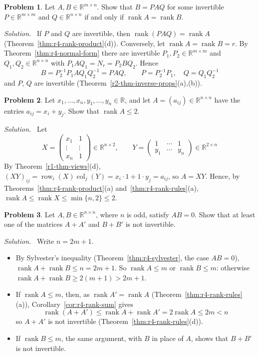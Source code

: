 \documentclass[12pt]{article}
\newcommand{\R}{\mathbb R}
\DeclareMathOperator{\row}{row}
\DeclareMathOperator{\col}{col}
\DeclareMathOperator{\rank}{rank}
\theoremstyle{definition}
\newtheorem{problem}{Problem}
\newenvironment{solution}{\par\noindent\textit{Solution.}\ }{\par\smallskip}
\begin{document}
\begin{problem}\label{r4-ex-equivalent}
Let \(A,B\in\R^{m\times n}\). Show that \(B=PAQ\) for some invertible \(P\in\R^{m\times m}\) and \(Q\in\R^{n\times n}\)
if and only if \(\rank A=\rank B\).
\end{problem}
\begin{solution}
If \(P\) and \(Q\) are invertible, then \(\rank(PAQ)=\rank A\) (Theorem~\ref{thm:r4-rank-product}(d)). Conversely, let
\(\rank A=\rank B=r\). By Theorem~\ref{thm:r4-normal-form} there are invertible \(P_1,P_2\in\R^{m\times m}\) and \(Q_1,Q_2\in\R^{n\times n}\) with
\(P_1AQ_1=N_r=P_2BQ_2\). Hence
\[
B=P_2^{-1}P_1AQ_1Q_2^{-1}=PAQ,\qquad P=P_2^{-1}P_1,\quad Q=Q_1Q_2^{-1}
\]
and \(P\), \(Q\) are invertible (Theorem~\ref{r2-thm-inverse-props}(a),(b)).
\end{solution}

\begin{problem}\label{r4-ex-pr-rank-two}
Let \(x_1,\dots,x_n,y_1,\dots,y_n\in\R\), and let \(A=(a_{ij})\in\R^{n\times n}\) have the entries \(a_{ij}=x_i+y_j\).
Show that \(\rank A\leqslant2\).
\end{problem}
\begin{solution}
Let
\[
X=\begin{pmatrix}x_1&1\\\vdots&\vdots\\x_n&1\end{pmatrix}\in\R^{n\times2},\qquad
Y=\begin{pmatrix}1&\cdots&1\\y_1&\cdots&y_n\end{pmatrix}\in\R^{2\times n}
\]
By Theorem~\ref{r1-thm-views}(d), \((XY)_{ij}=\row_i(X)\col_j(Y)=x_i\cdot1+1\cdot y_j=a_{ij}\), so \(A=XY\). Hence, by
Theorems~\ref{thm:r4-rank-product}(a) and~\ref{thm:r4-rank-rules}(a),
\(\rank A\leqslant\rank X\leqslant\min\{n,2\}\leqslant2\).
\end{solution}

\begin{problem}\label{r4-ex-pr-odd-order}
Let \(A,B\in\R^{n\times n}\), where \(n\) is odd, satisfy \(AB=0\). Show that at least one of the matrices \(A+A'\) and
\(B+B'\) is not invertible.
\end{problem}
\begin{solution}
Write \(n=2m+1\).
\begin{itemize}
\item By Sylvester's inequality (Theorem~\ref{thm:r4-sylvester}, the case \(AB=0\)),
\(\rank A+\rank B\leqslant n=2m+1\). So \(\rank A\leqslant m\) or \(\rank B\leqslant m\): otherwise
\(\rank A+\rank B\geqslant2(m+1)>2m+1\).
\item If \(\rank A\leqslant m\), then, as \(\rank A'=\rank A\) (Theorem~\ref{thm:r4-rank-rules}(a)),
Corollary~\ref{cor:r4-rank-sum} gives
\[
\rank(A+A')\leqslant\rank A+\rank A'=2\rank A\leqslant2m<n
\]
so \(A+A'\) is not invertible (Theorem~\ref{thm:r4-rank-rules}(d)).
\item If \(\rank B\leqslant m\), the same argument, with \(B\) in place of \(A\), shows that \(B+B'\) is not invertible.
\end{itemize}
\end{solution}
\end{document}
